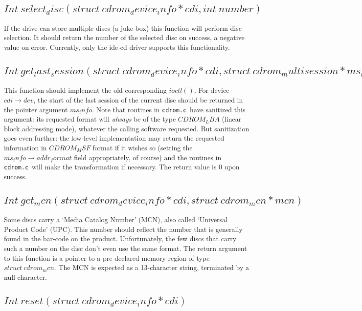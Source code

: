 \documentclass{article}
\def\cdromc{{\tt {cdrom.c}}}
\begin{document}
\subsection{$Int\ select_disc(struct\ cdrom_device_info * cdi, int\ number)$}

If the drive can store multiple discs (a juke-box) this function
will perform disc selection. It should return the number of the
selected disc on success, a negative value on error. Currently, only
the ide-cd driver supports this functionality.

\subsection{$Int\ get_last_session(struct\ cdrom_device_info * cdi, struct\
  cdrom_multisession * ms_info)$}

This function should implement the old corresponding $ioctl()$. For
device $cdi\to dev$, the start of the last session of the current disc
should be returned in the pointer argument $ms_info$. Note that
routines in \cdromc\ have sanitized this argument: its requested
format will {\em always\/} be of the type $CDROM_LBA$ (linear block
addressing mode), whatever the calling software requested. But
sanitization goes even further: the low-level implementation may
return the requested information in $CDROM_MSF$ format if it wishes so
(setting the $ms_info\rightarrow addr_format$ field appropriately, of
course) and the routines in \cdromc\ will make the transformation if
necessary. The return value is 0 upon success.

\subsection{$Int\ get_mcn(struct\ cdrom_device_info * cdi, struct\
  cdrom_mcn * mcn)$}

Some discs carry a `Media Catalog Number' (MCN), also called
`Universal Product Code' (UPC). This number should reflect the number
that is generally found in the bar-code on the product. Unfortunately,
the few discs that carry such a number on the disc don't even use the
same format. The return argument to this function is a pointer to a
pre-declared memory region of type $struct\ cdrom_mcn$. The MCN is
expected as a 13-character string, terminated by a null-character.

\subsection{$Int\ reset(struct\ cdrom_device_info * cdi)$}
\end{document}
